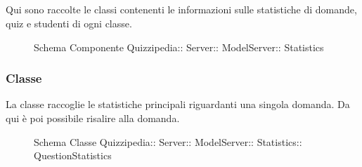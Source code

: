 \subsection{}
Qui sono raccolte le classi contenenti le informazioni sulle statistiche di domande, quiz e studenti di ogni classe.
\begin{figure}[H]
\centering
\noindent{}
\caption[Schema Componente Quizzipedia::Server::ModelServer::Statistics]{Schema Componente Quizzipedia:: Server:: ModelServer:: Statistics}
\end{figure}
\subsubsection{Classe }
La classe raccoglie le statistiche principali riguardanti una singola domanda. Da qui è poi possibile risalire alla domanda.
\begin{figure}[H]
\centering
\noindent{}
\caption[Schema Classe QuestionStatistics]{Schema Classe Quizzipedia:: Server:: ModelServer:: Statistics:: QuestionStatistics}
\end{figure}
